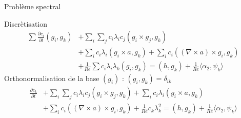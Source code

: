 \documentclass{beamer}
\newcommand{\rot}{{\nabla\times}}
\begin{document}
\begin{frame}{Problème spectral}
\begin{block}{Discrètisation}
\[
\begin{aligned}
\sum \frac{\partial c_i}{\partial t}(g_i,g_k) &+ \sum_i\sum_j c_i\lambda_i c_j(g_i\times g_j, g_k) \\
&+ \sum_i c_i\lambda_i(g_i\times a,g_k) + \sum_i c_i((\rot a)\times g_i, g_k) \\
&+ \frac{1}{Re}\sum c_i\lambda_i\lambda_k(g_i,g_k) = (h,g_k) + \frac{1}{Re}\langle\alpha_2,\psi_k\rangle
\end{aligned}
\]
Orthonormalisation de la base $(g_i)$ : $(g_i,g_k)=\delta_{ik}$
\[
\begin{aligned}
\frac{\partial c_k}{\partial t} &+ \sum_i\sum_j c_i\lambda_i c_j(g_i\times g_j, g_k) + \sum_i c_i\lambda_i(g_i\times a,g_k)\\
&+ \sum_i c_i((\rot a)\times g_i, g_k) + \frac{1}{Re}c_k\lambda_k^2 = (h,g_k) + \frac{1}{Re}\langle\alpha_2,\psi_k\rangle
\end{aligned}
\]
\end{block}
\end{frame}
\end{document}
